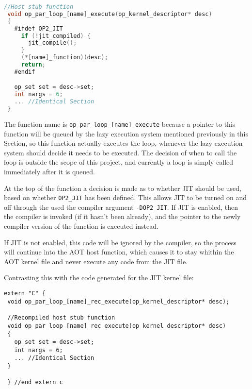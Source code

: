 \begin{lstlisting}[linewidth = \textwidth, framesep=0pt, language=C, linebackgroundcolor={\ifnum\value{lstnumber}=14\color{red!20} \else \color{blue!20} \fi}]
 //Host stub function
 void op_par_loop_[name]_execute(op_kernel_descriptor* desc)
 {
   #ifdef OP2_JIT
     if (!jit_compiled) {
       jit_compile();
     }
     (*[name]_function)(desc);
     return;
   #endif

   op_set set = desc->set;
   int nargs = 6;
   ... //Identical Section
 }
\end{lstlisting}
\vspace{-1em}
The function name is \verb|op_par_loop_[name]_execute| because a pointer to this function will be queued by the lazy execution system mentioned previously in this Section, so this function actually executes the loop, whenever the lazy execution system should decide it needs to be executed. The decision of when to call the loop is outside the scope of this project, and currently a loop is simply called immediately after it is queued.
\par At the top of the function a decision is made as to whether JIT should be used, based on whether \verb|OP2_JIT| has been defined. This allows JIT to be turned on and off through the used the compiler argument \verb|-DOP2_JIT|. If JIT is enabled, then the compiler is invoked (if it hasn't been already), and the pointer to the newly compiler version of the function is executed instead.
\par
If JIT is not enabled, this code will be ignored by the compiler, so the process will continue into the AOT host function, which causes it to stay whithin the AOT kernel file and never execute any code from the JIT file.

Contrasting this with the code generated for the JIT kernel file:

\begin{lstlisting}[linewidth = \textwidth, framesep=0pt, linebackgroundcolor={\ifnum\value{lstnumber}=9\color{red!20} \else \color{green!20} \fi}]
 extern "C" {
 void op_par_loop_[name]_rec_execute(op_kernel_descriptor* desc);

 //Recompiled host stub function
 void op_par_loop_[name]_rec_execute(op_kernel_descriptor* desc)
 {
   op_set set = desc->set;
   int nargs = 6;
   ... //Identical Section
 }

 } //end extern c
\end{lstlisting}
\vspace{-1em}

